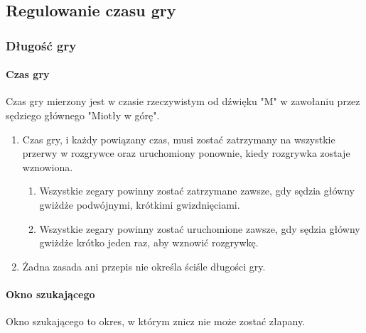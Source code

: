 \documentclass[12pt]{article}
\begin{document}
\subsection{Regulowanie czasu gry}

\subsubsection{Długość gry}

\paragraph{Czas gry}
Czas gry mierzony jest w czasie
rzeczywistym od dźwięku "M" w zawołaniu przez sędziego głównego "Miotły
w górę".

\begin{enumerate}
\item Czas gry, i każdy powiązany czas, musi zostać zatrzymany na wszystkie
przerwy w rozgrywce oraz uruchomiony ponownie, kiedy rozgrywka zostaje
wznowiona.
\begin{enumerate}
\item Wszystkie zegary powinny zostać zatrzymane zawsze, gdy sędzia główny
gwiżdże podwójnymi, krótkimi gwizdnięciami.

\item Wszystkie zegary powinny zostać uruchomione zawsze, gdy sędzia
główny gwiżdże krótko jeden raz, aby wznowić rozgrywkę.
\end{enumerate}

\item Żadna zasada ani przepis nie określa ściśle długości gry.
\end{enumerate}

\paragraph{Okno szukającego} 
Okno szukającego to okres, w którym
znicz nie może zostać złapany.
\end{document}
